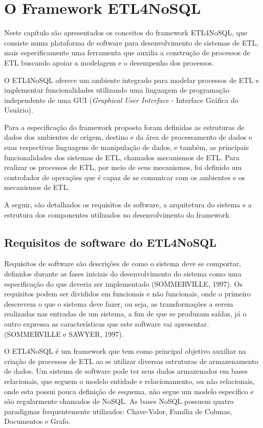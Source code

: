 \chapter{O Framework ETL4NoSQL}
Neste capítulo são apresentados os conceitos do framework ETL4NoSQL, que consiste numa plataforma de software para desenvolvimento de sistemas de ETL, mais especificamente uma ferramenta que auxilia a construção de processos de ETL buscando apoiar a modelagem e o desempenho dos processos. 

O ETL4NoSQL oferece um ambiente integrado para modelar processos de ETL e implementar funcionalidades utilizando uma linguagem de programação independente de uma GUI (\emph{Graphical User Interface} - Interface Gráfica do Usuário).


Para a especificação do framework proposto foram definidas as estruturas de dados dos ambientes de origem, destino e da área de processamento de dados e suas respectivas linguagens de manipulação de dados, e também, as principais funcionalidades dos sistemas de ETL, chamados mecanismos de ETL. Para realizar os processos de ETL, por meio de seus mecanismos, foi definido um controlador de operações que é capaz de se comunicar com os ambientes e os mecanismos de ETL. 

A seguir, são detalhados os requisitos de software, a arquitetura do sistema e a estrutura dos componentes utilizados no desenvolvimento do framework.

\clearpage
\section{Requisitos de software do ETL4NoSQL}


Requisitos de software são descrições de como o sistema deve se comportar, definidos durante as fases iniciais do desenvolvimento do sistema como uma especificação do que deveria ser implementado (SOMMERVILLE, 1997). Os requisitos podem ser divididos em funcionais e não funcionais, onde o primeiro descrevem o que o sistema deve fazer, ou seja, as transformações a
serem realizadas nas entradas de um sistema, a fim de que se produzam saídas, já o outro expressa as características que este software vai apresentar.(SOMMERVILLE e SAWYER, 1997). 

O ETL4NoSQL é um framework que tem como principal objetivo auxiliar na criação de processos de ETL ao se utilizar diversas estruturas de armazenamento de dados. Um sistema de software pode ter seus dados armazenados em bases relacionais, que seguem o modelo entidade e relacionamento, ou não relacionais, onde esta possui pouca definição de esquema, não segue um modelo específico e são regularmente chamados de NoSQL. As bases NoSQL possuem quatro paradigmas frequentemente utilizados: Chave-Valor, Família de Colunas, Documentos e Grafo.

